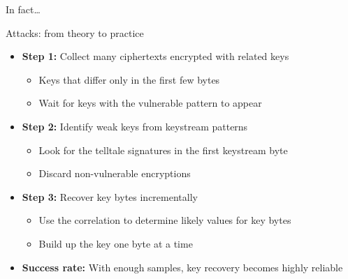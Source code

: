 \documentclass[aspectratio=169, lualatex, handout]{beamer}
\begin{document}
\begin{frame}{In fact\ldots}
\end{frame}

\begin{frame}{Attacks: from theory to practice}
	\begin{itemize}[<+->]
		\item \textbf{Step 1:} Collect many ciphertexts encrypted with related keys
		      \begin{itemize}[<+->]
			      \item Keys that differ only in the first few bytes
			      \item Wait for keys with the vulnerable pattern to appear
		      \end{itemize}
		\item \textbf{Step 2:} Identify weak keys from keystream patterns
		      \begin{itemize}[<+->]
			      \item Look for the telltale signatures in the first keystream byte
			      \item Discard non-vulnerable encryptions
		      \end{itemize}
		\item \textbf{Step 3:} Recover key bytes incrementally
		      \begin{itemize}[<+->]
			      \item Use the correlation to determine likely values for key bytes
			      \item Build up the key one byte at a time
		      \end{itemize}
		\item \textbf{Success rate:} With enough samples, key recovery becomes highly reliable
	\end{itemize}
\end{frame}
\end{document}
